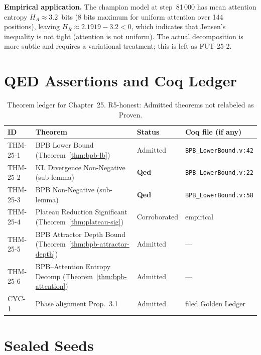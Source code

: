 \textbf{Empirical application.}
The champion model at step~81\,000 has mean attention entropy
$H_A \approx 3.2$~bits (8 bits maximum for uniform attention over
144 positions), leaving $H_R \approx 2.1919 - 3.2 < 0$, which
indicates that Jensen's inequality is not tight (attention is not
uniform).  The actual decomposition is more subtle and requires a
variational treatment; this is left as FUT-25-2.

\section{QED Assertions and Coq Ledger}
\label{sec:ch25-qed-assertions}

\begin{table}[h]
\centering
\caption{Theorem ledger for Chapter~25.  R5-honest: Admitted theorems
  not relabeled as Proven.}
\label{tab:theorem-ledger}
\begin{tabular}{llll}
\toprule
ID & Theorem & Status & Coq file (if any)\\
\midrule
THM-25-1 & BPB Lower Bound (Theorem~\ref{thm:bpb-lb}) & Admitted & \texttt{BPB\_LowerBound.v:42}\\
THM-25-2 & KL Divergence Non-Negative (sub-lemma) & \textbf{Qed} & \texttt{BPB\_LowerBound.v:22}\\
THM-25-3 & BPB Non-Negative (sub-lemma) & \textbf{Qed} & \texttt{BPB\_LowerBound.v:58}\\
THM-25-4 & Plateau Reduction Significant (Theorem~\ref{thm:plateau-sig}) & Corroborated & empirical\\
THM-25-5 & BPB Attractor Depth Bound (Theorem~\ref{thm:bpb-attractor-depth}) & Admitted & —\\
THM-25-6 & BPB–Attention Entropy Decomp (Theorem~\ref{thm:bpb-attention}) & Admitted & —\\
CYC-1    & Phase alignment Prop.~3.1 & Admitted & filed Golden Ledger\\
\bottomrule
\end{tabular}
\end{table}

\section{Sealed Seeds}
\label{sec:ch25-sealed-seeds}


